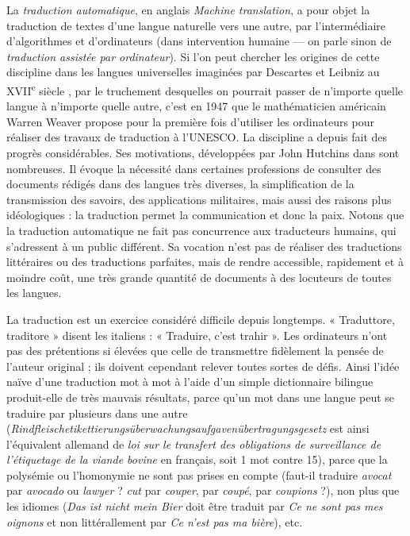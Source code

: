 \documentclass[a4paper,10pt]{article}
\newcommand{\guill}[1]{« #1 »}
\begin{document}
La \emph{traduction automatique}, en anglais \emph{Machine translation}, a pour objet la traduction de textes d'une langue naturelle vers une autre, par l'intermédiaire d'algorithmes et d'ordinateurs (dans intervention humaine --- on parle sinon de \emph{traduction assistée par ordinateur}). Si l'on peut chercher les origines de cette discipline dans les langues universelles imaginées par Descartes et Leibniz au XVII\textsuperscript{e} siècle
, par le truchement desquelles on pourrait passer de n'importe quelle langue à n'importe quelle autre, c'est en 1947 que le mathématicien américain Warren Weaver propose pour la première fois d'utiliser les ordinateurs pour réaliser des travaux de traduction à l'UNESCO.
La discipline a depuis fait des progrès considérables. Ses motivations, développées par John Hutchins dans
sont nombreuses. Il évoque la nécessité dans certaines professions de consulter des documents rédigés dans des langues très diverses, la simplification de la transmission des savoirs, des applications militaires, mais aussi des raisons plus idéologiques : la traduction permet la communication et donc la paix. Notons que la traduction automatique ne fait pas concurrence aux traducteurs humains, qui s'adressent à un public différent. Sa vocation n'est pas de réaliser des traductions littéraires ou des traductions parfaites, mais de rendre accessible, rapidement et à moindre coût, une très grande quantité de documents à des locuteurs de toutes les langues.

La traduction est un exercice considéré difficile depuis longtemps. \guill{Traduttore, traditore} disent les italiens : \guill{Traduire, c'est trahir}. Les ordinateurs n'ont pas des prétentions si élevées que celle de transmettre fidèlement la pensée de l'auteur original ; ils doivent cependant relever toutes sortes de défis. Ainsi l'idée naïve d'une traduction mot à mot à l'aide d'un simple dictionnaire bilingue produit-elle de très mauvais résultats, parce qu'un mot dans une langue peut se traduire par plusieurs dans une autre (\emph{Rindfleischetikettierungsüberwachungsaufgavenübertragungsgesetz} est ainsi l'équivalent allemand de \emph{loi sur le transfert des obligations de surveillance de l'étiquetage de la viande bovine} en français, soit 1 mot contre 15), parce que la polysémie ou l'homonymie ne sont pas prises en compte (faut-il traduire \emph{avocat} par \emph{avocado} ou \emph{lawyer} ? \emph{cut} par \emph{couper}, par \emph{coupé}, par \emph{coupions} ?), non plus que les idiomes (\emph{Das ist nicht mein Bier} doit être traduit par \emph{Ce ne sont pas mes oignons} et non littérallement par \emph{Ce n'est pas ma bière}), etc.
\end{document}
